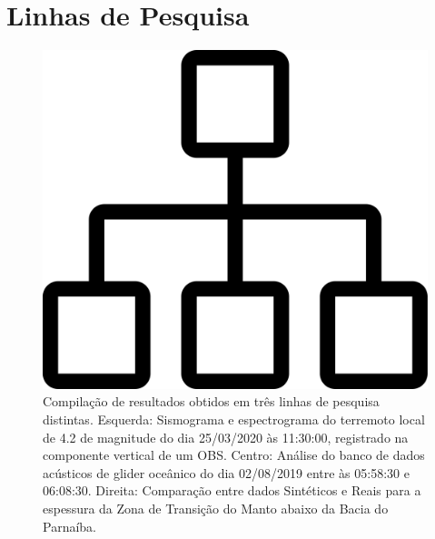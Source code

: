 \documentclass[10pt,a4paper,oneside]{book}
\newcommand{\HeroFigPad}{\vspace{-1cm}}
\begin{document}

\chapter{Linhas de Pesquisa}
\label{cap_pesquisa}

\begin{figure}[h]
  \HeroFigPad
  \begin{center}
    \includegraphics[width=\textwidth]{images/inicio.png}
  \end{center}
  \caption{
    Compilação de resultados obtidos em três linhas de pesquisa distintas. Esquerda: Sismograma e espectrograma do terremoto local de 4.2 de magnitude do dia 25/03/2020 às 11:30:00, registrado na componente vertical de um OBS. Centro: Análise do banco de dados acústicos de glider oceânico do dia 02/08/2019 entre às 05:58:30 e 06:08:30. Direita: Comparação entre dados Sintéticos e Reais para a  espessura da Zona de Transição do Manto abaixo da Bacia do Parnaíba.
  }
\end{figure}
\end{document}
